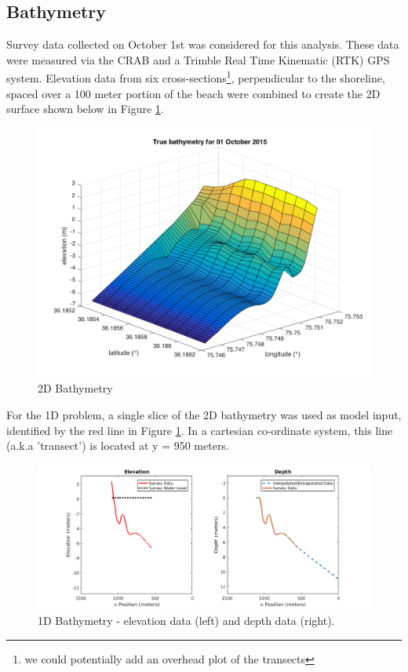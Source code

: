 \subsection{Bathymetry}
\label{sec: bathy}

	Survey data collected on October 1st was considered for this analysis. These data were measured via the CRAB and a Trimble Real Time Kinematic (RTK) GPS system. Elevation data from six cross-sections\footnote{we could potentially add an overhead plot of the transects}, perpendicular to the shoreline, spaced over a 100 meter portion of the beach were combined to create the 2D surface shown below in Figure \ref{2D Bath}. 
	
	 	\begin{figure}[H]
	 	\centering
	 	\includegraphics[width=0.6\linewidth]{img/trueBath2D.png}
	 	\caption{2D Bathymetry}
	 	\label{2D Bath}
	 	\end{figure}
	
	For the 1D problem, a single slice of the 2D bathymetry was used as model input, identified by the red line in Figure \ref{2D Bath}. In a cartesian co-ordinate system, this line (a.k.a 'transect') is located at y = 950 meters. 
		
		\begin{figure}[H]
		\centering
		\includegraphics[width = 1.0\linewidth]{img/trueBath1D.png}
		\caption{1D Bathymetry - elevation data (left) and depth data (right).}
		\label{1D Bath}
		\end{figure}
		
